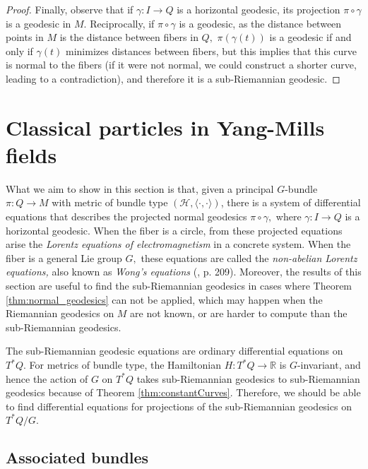 \documentclass[12pt, letterpaper, reqno]{amsart}
\theoremstyle{definition}
\theoremstyle{plain}
\theoremstyle{remark}
\begin{document}
\begin{proof}
	Finally, observe that if $ \gamma: I \rightarrow Q $ is a horizontal geodesic, its projection $ \pi\circ\gamma $ is a geodesic in $ M. $ Reciprocally, if $ \pi\circ\gamma $ is a geodesic, as the distance between points in $ M $ is the distance between fibers in $ Q, $ $ \pi(\gamma(t) ) $ is a geodesic if and only if $\gamma(t)$ minimizes distances between fibers, but this implies that this curve is normal to the fibers (if it were not normal, we could construct a shorter curve, leading to a contradiction), and therefore it is a sub-Riemannian geodesic.  
\end{proof}

\section{Classical particles in Yang-Mills fields}%
\label{sec:classical_particles_in_yang_mills_fields}


What we aim to show in this section is that, given a principal $ G $-bundle $ \pi:Q \rightarrow M $ with metric of bundle type $ (\mathcal{H}, \langle\cdot, \cdot \rangle) $,   there is a system of differential equations that describes the projected normal geodesics $ \pi\circ\gamma, $ where $ \gamma: I \rightarrow Q $ is a horizontal geodesic. When the fiber is a circle, from these projected equations arise the \textit{Lorentz equations of electromagnetism} in a concrete system. When the fiber is a general Lie group $ G, $ these equations are called the \textit{non-abelian Lorentz equations,} also known as \textit{Wong's equations} (\cite{montgomery2002tour}, p. 209). Moreover, the results of this section are useful to find the sub-Riemannian geodesics in cases where Theorem \ref{thm:normal_geodesics} can not be applied, which may happen when the Riemannian geodesics on $ M $ are not known, or are harder to compute than the sub-Riemannian geodesics.

The sub-Riemannian geodesic equations are ordinary differential equations on $ T^*Q. $ For metrics of bundle type, the Hamiltonian $ H: T^*Q \rightarrow  \mathbb{R} $ is $ G $-invariant, and hence the action of $ G $ on $ T^*Q $ takes sub-Riemannian geodesics to sub-Riemannian geodesics because of Theorem \ref{thm:constantCurves}. Therefore, we should be able to find differential equations for projections of the sub-Riemannian geodesics on $ T^*Q/G. $ 

 \subsection{Associated bundles}%
 \label{sub:associated_bundles}
\end{document}
